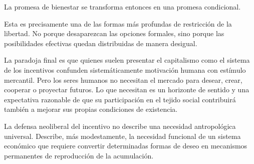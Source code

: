\documentclass[11pt,a4paper]{article}
\begin{document}
La promesa de bienestar se transforma entonces en una promesa condicional.

Esta es precisamente una de las formas más profundas de restricción de la libertad. No porque desaparezcan las opciones formales, sino porque las posibilidades efectivas quedan distribuidas de manera desigual.

La paradoja final es que quienes suelen presentar el capitalismo como el sistema de los incentivos confunden sistemáticamente motivación humana con estímulo mercantil. Pero los seres humanos no necesitan el mercado para desear, crear, cooperar o proyectar futuros. Lo que necesitan es un horizonte de sentido y una expectativa razonable de que su participación en el tejido social contribuirá también a mejorar sus propias condiciones de existencia.

La defensa neoliberal del incentivo no describe una necesidad antropológica universal. Describe, más modestamente, la necesidad funcional de un sistema económico que requiere convertir determinadas formas de deseo en mecanismos permanentes de reproducción de la acumulación.
\end{document}
